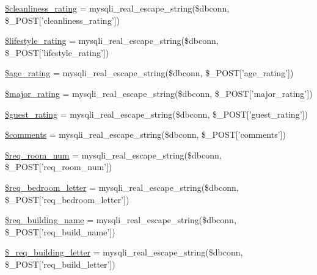 \begin{DoxyCompactItemize}
\item 
\hyperlink{admin__view_2validate_2studentVal_8php_aa181e44821f174a8b2551d5c30c03c1d}{\$cleanliness\-\_\-rating} = mysqli\-\_\-real\-\_\-escape\-\_\-string(\$dbconn, \$\-\_\-\-P\-O\-S\-T\mbox{[}'cleanliness\-\_\-rating'\mbox{]})
\item 
\hyperlink{admin__view_2validate_2studentVal_8php_aeaacae1f81e4a03e1332c1e322315730}{\$lifestyle\-\_\-rating} = mysqli\-\_\-real\-\_\-escape\-\_\-string(\$dbconn, \$\-\_\-\-P\-O\-S\-T\mbox{[}'lifestyle\-\_\-rating'\mbox{]})
\item 
\hyperlink{admin__view_2validate_2studentVal_8php_a69122fb82424ff3bb0780b56f8bc8e6d}{\$age\-\_\-rating} = mysqli\-\_\-real\-\_\-escape\-\_\-string(\$dbconn, \$\-\_\-\-P\-O\-S\-T\mbox{[}'age\-\_\-rating'\mbox{]})
\item 
\hyperlink{admin__view_2validate_2studentVal_8php_a658e327f04cd3d91c4a064f7f496ccef}{\$major\-\_\-rating} = mysqli\-\_\-real\-\_\-escape\-\_\-string(\$dbconn, \$\-\_\-\-P\-O\-S\-T\mbox{[}'major\-\_\-rating'\mbox{]})
\item 
\hyperlink{admin__view_2validate_2studentVal_8php_ade1951cffb40e000076f5d81e34e41d8}{\$guest\-\_\-rating} = mysqli\-\_\-real\-\_\-escape\-\_\-string(\$dbconn, \$\-\_\-\-P\-O\-S\-T\mbox{[}'guest\-\_\-rating'\mbox{]})
\item 
\hyperlink{admin__view_2validate_2studentVal_8php_a35e8cdeb473a5eb016fea893d14de951}{\$comments} = mysqli\-\_\-real\-\_\-escape\-\_\-string(\$dbconn, \$\-\_\-\-P\-O\-S\-T\mbox{[}'comments'\mbox{]})
\item 
\hyperlink{admin__view_2validate_2studentVal_8php_a03ada09603995a51dc132367698e687d}{\$req\-\_\-room\-\_\-num} = mysqli\-\_\-real\-\_\-escape\-\_\-string(\$dbconn, \$\-\_\-\-P\-O\-S\-T\mbox{[}'req\-\_\-room\-\_\-num'\mbox{]})
\item 
\hyperlink{admin__view_2validate_2studentVal_8php_adab4b11b8fdbb9622f5c281bcdcc8c5d}{\$req\-\_\-bedroom\-\_\-letter} = mysqli\-\_\-real\-\_\-escape\-\_\-string(\$dbconn, \$\-\_\-\-P\-O\-S\-T\mbox{[}'req\-\_\-bedroom\-\_\-letter'\mbox{]})
\item 
\hyperlink{admin__view_2validate_2studentVal_8php_a36592f31d5a2db44ff8fdf35ef05776d}{\$req\-\_\-building\-\_\-name} = mysqli\-\_\-real\-\_\-escape\-\_\-string(\$dbconn, \$\-\_\-\-P\-O\-S\-T\mbox{[}'req\-\_\-build\-\_\-name'\mbox{]})
\item 
\hyperlink{admin__view_2validate_2studentVal_8php_aa9cc64b4d1f994b0e4e2437b8bb61c96}{\$\-\_\-req\-\_\-building\-\_\-letter} = mysqli\-\_\-real\-\_\-escape\-\_\-string(\$dbconn, \$\-\_\-\-P\-O\-S\-T\mbox{[}'req\-\_\-build\-\_\-letter'\mbox{]})

\end{DoxyCompactItemize}
